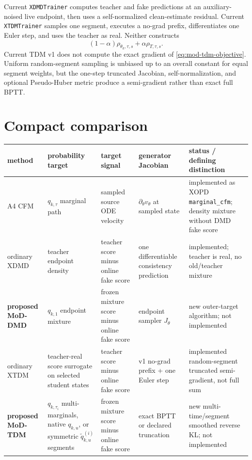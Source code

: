 \documentclass[11pt,a4paper]{article}
\theoremstyle{plain}
\theoremstyle{definition}
\begin{document}
Current \texttt{XDMDTrainer} computes teacher and fake predictions at an auxiliary-noised live
endpoint, then uses a self-normalized clean-estimate residual.  Current
\texttt{XTDMTrainer} samples one segment, executes a no-grad prefix, differentiates one Euler
step, and uses the teacher as real.  Neither constructs
\[
(1-\alpha)\rho_{\theta_k,\tau,s}+\alpha\rho_{T,\tau,s}.
\]
Current TDM v1 does not compute the exact gradient of
\eqref{eq:mod-tdm-objective}.  Uniform random-segment sampling is unbiased up to an overall
constant for equal segment weights, but the one-step truncated Jacobian, self-normalization, and
optional Pseudo-Huber metric produce a semi-gradient rather than exact full BPTT.

\section{Compact comparison}
\label{sec:comparison}

\begin{center}
\scriptsize
\setlength{\tabcolsep}{3.2pt}
\begin{tabular}{@{}
  >{\raggedright\arraybackslash}p{}
  >{\raggedright\arraybackslash}p{}
  >{\raggedright\arraybackslash}p{}
  >{\raggedright\arraybackslash}p{}
  >{\raggedright\arraybackslash}p{}
@{}}
\toprule
method & probability target & target signal & generator Jacobian & status / defining distinction\\
\midrule
A4 CFM
& $q_{k,\tau}$ marginal path
& sampled source ODE velocity
& $\partial_\theta v_\theta$ at sampled state
& implemented as XOPD \texttt{marginal\_cfm}; density mixture without DMD fake score\\
\addlinespace
ordinary XDMD
& teacher endpoint density
& teacher score minus online fake score
& one differentiable consistency prediction
& implemented; teacher is real, no old/teacher mixture\\
\addlinespace
\textbf{proposed MoD-DMD}
& $q_{k,1}$ endpoint mixture
& frozen mixture score minus online fake score
& endpoint sampler $J_\theta$
& new outer-target algorithm; not implemented\\
\addlinespace
ordinary XTDM
& teacher-real score surrogate on selected student states
& teacher score minus online fake score
& v1 no-grad prefix + one Euler step
& implemented random-segment truncated semi-gradient, not full sum\\
\addlinespace
\textbf{proposed MoD-TDM}
& $q_{k,\tau_i}$ multi-marginals, native $q_{k,u}$, or symmetric
  $\widetilde q_{k,u}^{(i)}$ segments
& frozen mixture score minus online fake score
& exact BPTT or declared truncation
& new multi-time/segment smoothed reverse KL; not implemented\\
\bottomrule
\end{tabular}
\end{center}
\end{document}
